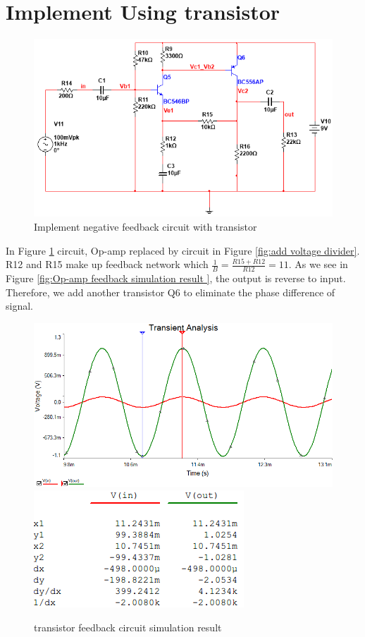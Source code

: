 \section{Implement Using transistor}


\begin{figure}[htbp]
\centering
\includegraphics[scale=0.7]{"../Photo/Chap2/transistor feedback"}
\caption{Implement negative feedback circuit with transistor}
\label{fig:transistorfeedback}
\end{figure}

In Figure \ref{fig:transistorfeedback} circuit, Op-amp replaced by circuit in Figure \ref{fig:add voltage divider}. R12 and R15 make up feedback network which $ \frac{1}{B} = \frac{R15+R12}{R12} = 11 $. As we see in Figure \ref{fig:Op-amp  feedback simulation result }, the output is reverse to input. Therefore, we add another transistor Q6 to eliminate the phase difference of signal.


\begin{figure}[htbp]
\centering
\includegraphics[scale=0.6]{"../Photo/Chap2/transistor feedback simulation wave"}\\[0.5cm]
\includegraphics[scale=1]{"../Photo/Chap2/transistor feedback simulation cursor data"}
\caption{transistor feedback circuit simulation result}
\label{fig:transistorfeedbacksimulationwave}
\end{figure}

